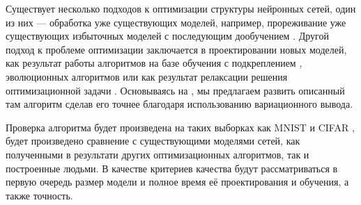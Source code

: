 \documentclass[12pt, twoside]{article}
\begin{document}
Существует несколько подходов к оптимизации структуры нейронных сетей, один из них --- обработка уже существующих моделей, например, прореживание уже существующих избыточных моделей с последующим дообучением \cite{learn_both} \cite{chan_prun} \cite{lottery_ticket}. Другой подход к проблеме оптимизации заключается в проектировании новых моделей, как результат работы алгоритмов на базе обучения с подкреплением \cite{nas}, эволюционных алгоритмов \cite{evol} или как результат релаксации решения оптимизационной задачи \cite{darts}. Основываясь на \cite{darts}, мы предлагаем развить описанный там алгоритм сделав его точнее благодаря использованию вариационного вывода.

Проверка алгоритма будет произведена на таких выборках как MNIST \cite{mnist} и CIFAR \cite{cifar}, будет произведено сравнение с существующими моделями сетей, как полученными в результати других оптимизационных алгоритмов, так и построенные людьми. В качестве критериев качества будут рассматриваться в первую очередь размер модели и полное время её проектирования и обучения, а также точность.





\end{document}
